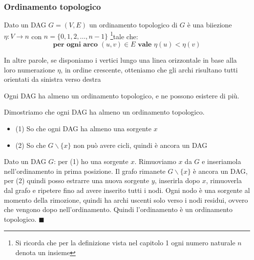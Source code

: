 \subsubsection{Ordinamento topologico}
\begin{definition}
    Dato un DAG $G = (V,E)$ un ordinamento topologico di $G$ è una biiezione $\eta: V \to n$ con $n = \{0,1,2,\ldots, n-1\}$ \footnote{Si ricorda che per la definizione vista nel capitolo 1 ogni numero naturale $n$ denota un insieme}tale che:
    \begin{equation}
        \textbf{per ogni arco } (u,v) \in E \textbf{ vale } \eta(u) < \eta(v)
    \end{equation}
\end{definition}
\hspace{-15pt}In altre parole, se disponiamo i vertici lungo una linea orizzontale in base alla loro numerazione $\eta$, in ordine crescente, otteniamo che gli archi risultano tutti orientati da sinistra verso destra






\begin{proposition}
    Ogni DAG ha almeno un ordinamento topologico, e ne possono esistere di più.
\end{proposition}

\begin{demostration}
    Dimostriamo che ogni DAG ha almeno un ordinamento topologico.

    \begin{itemize}
        \item (1) So che ogni DAG ha almeno una sorgente $x$
        \item (2) So che $G \smallsetminus \{ x \} $ non può avere cicli, quindi è ancora un DAG
    \end{itemize}

    Dato un DAG $G$: per (1) ho una sorgente $x$. Rimuoviamo $x$ da $G$ e inseriamola nell'ordinamento in prima posizione. Il grafo rimanete $G \smallsetminus \{ x \}$ è ancora un DAG, per (2) quindi posso estrarre una nuova sorgente $y$, inserirla dopo $x$, rimuoverla dal grafo e ripetere fino ad avere inserito tutti i nodi.
    Ogni nodo è una sorgente al momento della rimozione, quindi ha archi uscenti solo verso i nodi residui, ovvero che vengono dopo nell'ordinamento. Quindi l'ordinamento è un ordinamento topologico. $\blacksquare$
\end{demostration}

